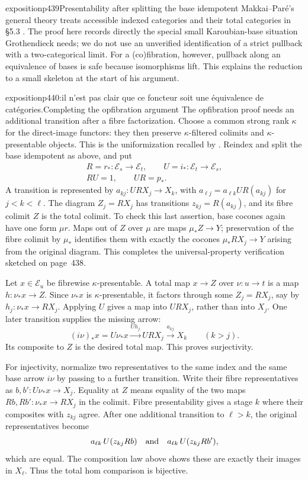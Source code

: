 \begin{dcomment}{exposition}{p439}{Presentability after splitting the base idempotent}
Makkai--Par\'e's general theory treats accessible indexed categories and their total categories in \S5.3 \citep{MakkaiPare1989}. The proof here records directly the special small Karoubian-base situation Grothendieck needs; we do not use an unverified identification of a strict pullback with a two-categorical limit. For a (co)fibration, however, pullback along an equivalence of bases is safe because isomorphisms lift. This explains the reduction to a small skeleton at the start of his argument.
\end{dcomment}

\begin{dcomment}{exposition}{p440:il n'est pas clair que ce foncteur soit une équivalence de catégories.}{Completing the opfibration argument}
The opfibration proof needs an additional transition after a fibre factorization. Choose a common strong rank $\kappa$ for the direct-image functors: they then preserve $\kappa$-filtered colimits and $\kappa$-presentable objects. This is the uniformization recalled by \citet[Introduction and proof of Theorem~2.1]{PareRosicky2013}. Reindex and split the base idempotent as above, and put
\[
 \begin{gathered}
 R=r_*:\mathcal E_s\to\mathcal E_t,
 \qquad U=i_*:\mathcal E_t\to\mathcal E_s,\\
 RU=1,\qquad UR=p_*.
 \end{gathered}
\]
A transition is represented by $a_{kj}:URX_j\to X_k$, with
$a_{\ell j}=a_{\ell k}UR(a_{kj})$ for $j<k<\ell$. The diagram $Z_j=RX_j$ has transitions $z_{kj}=R(a_{kj})$, and its fibre colimit $Z$ is the total colimit. To check this last assertion, base cocones again have one form $\mu r$. Maps out of $Z$ over $\mu$ are maps $\mu_*Z\to Y$; preservation of the fibre colimit by $\mu_*$ identifies them with exactly the cocones $\mu_*RX_j\to Y$ arising from the original diagram. This completes the universal-property verification sketched on page~438.

Let $x\in\mathcal E_u$ be fibrewise $\kappa$-presentable. A total map $x\to Z$ over $\nu:u\to t$ is a map $h:\nu_*x\to Z$. Since $\nu_*x$ is $\kappa$-presentable, it factors through some $Z_j=RX_j$, say by $h_j:\nu_*x\to RX_j$. Applying $U$ gives a map into $URX_j$, rather than into $X_j$. One later transition supplies the missing arrow:
\[
 (i\nu)_*x=U\nu_*x
       \xrightarrow{Uh_j}URX_j
       \xrightarrow{a_{kj}}X_k\qquad(k>j).
\]
Its composite to $Z$ is the desired total map. This proves surjectivity.

For injectivity, normalize two representatives to the same index and the same base arrow $i\nu$ by passing to a further transition. Write their fibre representatives as $b,b':U\nu_*x\to X_j$. Equality at $Z$ means equality of the two maps $Rb,Rb':\nu_*x\to RX_j$ in the colimit. Fibre presentability gives a stage $k$ where their composites with $z_{kj}$ agree. After one additional transition to $\ell>k$, the original representatives become
\[
 a_{\ell k}\,U(z_{kj}Rb)
 \quad\hbox{and}\quad
 a_{\ell k}\,U(z_{kj}Rb'),
\]
which are equal. The composition law above shows these are exactly their images in $X_\ell$. Thus the total hom comparison is bijective.


\end{dcomment}
